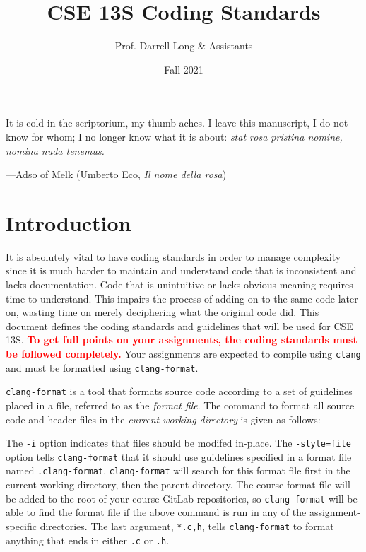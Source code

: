 \documentclass[11pt]{article}
\title{CSE 13S Coding Standards}
\author{Prof. Darrell Long \& Assistants}
\date{Fall 2021}
\begin{document}
\maketitle

\textwidth
\epigraph{It is cold in the scriptorium, my thumb aches. I leave
this manuscript, I do not know for whom; I no longer know what it
is about: \emph{stat rosa pristina nomine, nomina nuda tenemus.}}{---Adso of
Melk (Umberto Eco, \emph{Il nome della rosa})}

\section{Introduction}

It is absolutely vital to have coding standards in order to manage
complexity since it is much harder to maintain and understand code that
is inconsistent and lacks documentation. Code that is unintuitive or
lacks obvious meaning requires time to understand. This impairs the
process of adding on to the same code later on, wasting time on merely
deciphering what the original code did. This document defines the coding
standards and guidelines that will be used for CSE\,13S.
\textcolor{red}{\textbf{To get full points on your assignments, the
coding standards must be followed completely.}} Your assignments are
expected to compile using \texttt{clang} and must be formatted using
\texttt{clang-format}.

\texttt{clang-format} is a tool that formats source code according to a
set of guidelines placed in a file, referred to as the \emph{format
file}. The command to format all source code and header files in the
\emph{current working directory} is given as follows:


The \texttt{-i} option indicates that files should be modifed in-place.
The \texttt{-style=file} option tells \texttt{clang-format} that it
should use guidelines specified in a format file named
\texttt{.clang-format}. \texttt{clang-format} will search for this
format file first in the current working directory, then the parent
directory. The course format file will be added to the root of your
course GitLab repositories, so \texttt{clang-format} will be able to
find the format file if the above command is run in any of the
assignment-specific directories. The last argument, \texttt{*.{c,h}},
tells \texttt{clang-format} to format anything that ends in either
\texttt{.c} or \texttt{.h}.
\end{document}
